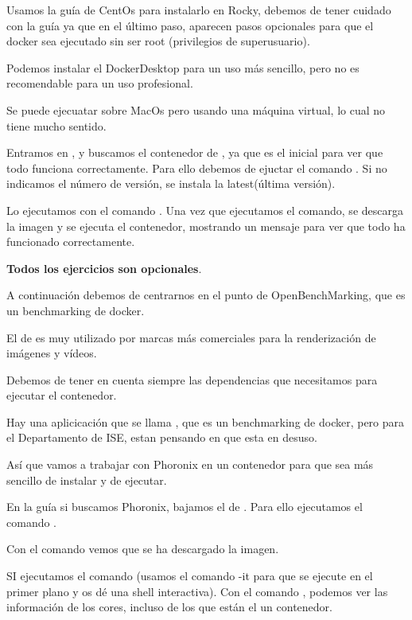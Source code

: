 Usamos la guía de CentOs para instalarlo en Rocky, debemos de tener cuidado con la guía ya que en el último paso, aparecen pasos opcionales para que el docker sea ejecutado sin ser root (privilegios de superusuario).

Podemos instalar el DockerDesktop para un uso más sencillo, pero no es recomendable para un uso profesional.

Se puede ejecuatar sobre MacOs pero usando una máquina virtual, lo cual no tiene mucho sentido.

Entramos en , y buscamos el contenedor de , ya que es el inicial para ver que todo funciona correctamente. Para ello debemos de ejuctar el comando . Si no indicamos el número de versión, se instala la latest(última versión).

Lo ejecutamos con el comando . Una vez que ejecutamos el comando, se descarga la imagen y se ejecuta el contenedor, mostrando un mensaje para ver que todo ha funcionado correctamente.

\textbf{Todos los ejercicios son opcionales}.

A continuación debemos de centrarnos en el punto de OpenBenchMarking, que es un benchmarking de docker.

El de  es muy utilizado por marcas más comerciales para la renderización de imágenes y vídeos.

Debemos de tener en cuenta siempre las dependencias que necesitamos para ejecutar el contenedor.

Hay una aplicicación que se llama , que es un benchmarking de docker, pero para el Departamento de ISE, estan pensando en que esta en desuso.

Así que vamos a trabajar con Phoronix en un contenedor para que sea más sencillo de instalar y de ejecutar.

En la guía si buscamos Phoronix, bajamos el de . Para ello ejecutamos el comando .

Con el comando  vemos que se ha descargado la imagen.

SI ejecutamos el comando  (usamos el comando -it para que se ejecute en el primer plano y os dé una shell interactiva). Con el comando , podemos ver las información de los cores, incluso de los que están el un contenedor.

